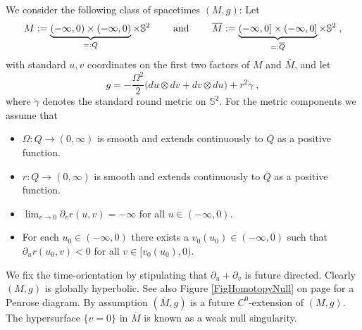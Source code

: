 \documentclass[reqno]{article}
\begin{document}
We consider the following class of spacetimes $(M,g)$:
Let $$M := \underbrace{(-\infty,0) \times (-\infty, 0)}_{=: Q} \times \mathbb{S}^2 \qquad \textnormal{ and } \qquad \overline{M} :=\underbrace{(-\infty, 0] \times (-\infty, 0]}_{=: \overline{Q}} \times \mathbb{S}^2 \;,$$
with standard $u,v$ coordinates on the first two factors of $M$ and $\overline{M}$, and let
$$g = -\frac{\Omega^2}{2} \big( du \otimes dv + dv \otimes du\big) + r^2 \mathring{\gamma} \;,$$
where $\mathring{\gamma}$ denotes the standard round metric on $\mathbb{S}^2$. For the metric components we assume that
\begin{itemize}
\item $\Omega : Q \to (0,\infty)$  is smooth and extends continuously to $\overline{Q}$ as a positive function.\\[-15pt]
\item $r : Q \to (0,\infty)$ is smooth and extends continuously to $\overline{Q}$ as a positive function.\\[-15pt]
\item  $\lim_{v \to 0} \partial_v r (u,v) = -\infty $ for all $u \in (-\infty, 0)$. \\[-15pt]
\item For each $u_0 \in (-\infty, 0)$ there exists a $v_0(u_0)  \in (-\infty, 0)$ such that $\partial_u r (u_0,v) <0$ for all $v \in [v_0(u_0), 0)$.
\end{itemize}
We fix the time-orientation by stipulating that $\partial_u + \partial_v$ is future directed. Clearly $(M,g)$ is globally hyperbolic. See also Figure \ref{FigHomotopyNull} on page \pageref{FigHomotopyNull}  for a Penrose diagram. By assumption $(\overline{M}, g)$ is a future $C^0$-extension of $(M,g)$. The hypersurface $\{v = 0\}$ in $\overline{M}$ is known as a weak null singularity.
\end{document}

